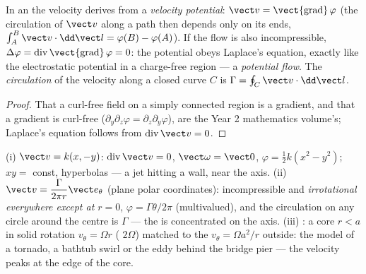 \begin{definition}\label{def:b2:fluid-kinematics:potential}
In an  the velocity derives from a \emph{velocity
potential}: $\vect v = \operatorname{\vect{grad}}\varphi$ (the circulation
of $\vect v$ along a path then depends only on its ends, $\int_A^B\vect v
\cdot\dd\vect l = \varphi(B) - \varphi(A)$). If the flow is also
incompressible, $\Delta\varphi = \operatorname{div}\operatorname{\vect{grad}}
\varphi = 0$: the potential obeys Laplace's equation, exactly like the
electrostatic potential in a charge-free region --- a \emph{potential
flow}. The \emph{circulation} of the velocity along a closed curve $C$
is $\Gamma = \oint_C\vect v\cdot\dd\vect l$.
\end{definition}

\begin{proof}
That a curl-free field on a simply connected region is a gradient, and
that a gradient is curl-free ($\partial_y\partial_z\varphi = \partial_z\partial_y\varphi$),
are the Year 2 mathematics volume's; Laplace's equation follows from
$\operatorname{div}\vect v = 0$.
\end{proof}

\begin{example}\label{ex:b2:fluid-kinematics:planeflows}
(i) \emph{} $\vect v = k(x, -y)$: $\operatorname{div}\vect v =
0$, $\vect\omega = \vect 0$, $\varphi = \tfrac12k(x^2 - y^2)$; 
$xy = $ const, hyperbolas --- a jet hitting a wall, near the axis. (ii)
\emph{} $\vect v = \dfrac{\Gamma}{2\pi r}\vect e_\theta$ (plane
polar coordinates): incompressible and \emph{irrotational everywhere
except at $r = 0$}, $\varphi = \Gamma\theta/2\pi$ (multivalued), and the
circulation on any circle around the centre is $\Gamma$ --- the
 is concentrated on the axis. (iii) \emph{}: a
core $r < a$ in solid rotation $v_\theta = \Omega r$ ( $2\Omega$)
matched to the  $v_\theta = \Omega a^2/r$ outside: the model of
a tornado, a bathtub swirl or the eddy behind the bridge pier --- the
velocity peaks at the edge of the core.
\end{example}

